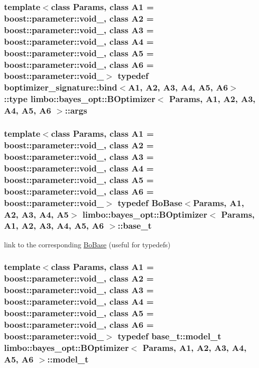 \subsubsection[{args}]{\setlength{\rightskip}{0pt plus 5cm}template$<$class Params, class A1 = boost\+::parameter\+::void\+\_\+, class A2 = boost\+::parameter\+::void\+\_\+, class A3 = boost\+::parameter\+::void\+\_\+, class A4 = boost\+::parameter\+::void\+\_\+, class A5 = boost\+::parameter\+::void\+\_\+, class A6 = boost\+::parameter\+::void\+\_\+$>$ typedef boptimizer\+\_\+signature\+::bind$<$A1, A2, A3, A4, A5, A6$>$\+::type {\bf limbo\+::bayes\+\_\+opt\+::\+B\+Optimizer}$<$ Params, A1, A2, A3, A4, A5, A6 $>$\+::{\bf args}}\label{classlimbo_1_1bayes__opt_1_1_b_optimizer_afd4c6a7d361de59fac5aa3a332ea0149}
\hypertarget{classlimbo_1_1bayes__opt_1_1_b_optimizer_a89d1cce7fdecc3598db103e337d942de}{}
\subsubsection[{base\+\_\+t}]{\setlength{\rightskip}{0pt plus 5cm}template$<$class Params, class A1 = boost\+::parameter\+::void\+\_\+, class A2 = boost\+::parameter\+::void\+\_\+, class A3 = boost\+::parameter\+::void\+\_\+, class A4 = boost\+::parameter\+::void\+\_\+, class A5 = boost\+::parameter\+::void\+\_\+, class A6 = boost\+::parameter\+::void\+\_\+$>$ typedef {\bf Bo\+Base}$<$Params, A1, A2, A3, A4, A5$>$ {\bf limbo\+::bayes\+\_\+opt\+::\+B\+Optimizer}$<$ Params, A1, A2, A3, A4, A5, A6 $>$\+::{\bf base\+\_\+t}}\label{classlimbo_1_1bayes__opt_1_1_b_optimizer_a89d1cce7fdecc3598db103e337d942de}


link to the corresponding \hyperlink{classlimbo_1_1bayes__opt_1_1_bo_base}{Bo\+Base} (useful for typedefs) 

\hypertarget{classlimbo_1_1bayes__opt_1_1_b_optimizer_aaddb85f5014ba377c9e2e3a64db87678}{}
\subsubsection[{model\+\_\+t}]{\setlength{\rightskip}{0pt plus 5cm}template$<$class Params, class A1 = boost\+::parameter\+::void\+\_\+, class A2 = boost\+::parameter\+::void\+\_\+, class A3 = boost\+::parameter\+::void\+\_\+, class A4 = boost\+::parameter\+::void\+\_\+, class A5 = boost\+::parameter\+::void\+\_\+, class A6 = boost\+::parameter\+::void\+\_\+$>$ typedef {\bf base\+\_\+t\+::model\+\_\+t} {\bf limbo\+::bayes\+\_\+opt\+::\+B\+Optimizer}$<$ Params, A1, A2, A3, A4, A5, A6 $>$\+::{\bf model\+\_\+t}}\label{classlimbo_1_1bayes__opt_1_1_b_optimizer_aaddb85f5014ba377c9e2e3a64db87678}


